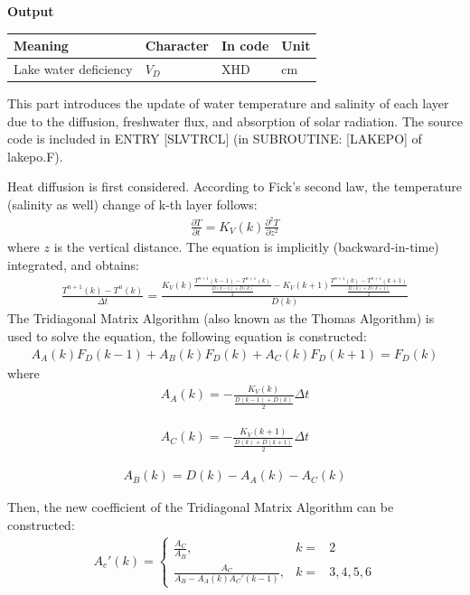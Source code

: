 \textbf{Output}

\begin{longtable}[]{@{}llll@{}}
\toprule
Meaning & Character & In code & Unit \\
\midrule
\endhead
Lake water deficiency & \(V_{D}\) & XHD & cm \\
\bottomrule
\end{longtable}

This part introduces the update of water temperature and salinity of each layer due to the diffusion, freshwater flux, and absorption of solar radiation. The source code is included in ENTRY
{[}SLVTRCL{]} (in SUBROUTINE: {[}LAKEPO{]} of lakepo.F).

Heat diffusion is first considered. According to Fick's second law, the temperature (salinity as well) change of k-th layer follows: \begin{eqnarray}
\frac{\partial T}{\partial t}=K_{V}(k)\frac{\partial^2 T}{\partial z^2}
\end{eqnarray} where \(z\) is the vertical distance. The equation is implicitly (backward-in-time) integrated, and obtains: \begin{eqnarray}
\frac{T^{n+1}(k)-T^{n}(k)}{\Delta t}=\frac{K_{V}(k)\frac{T^{n+1}(k-1)-T^{n+1}(k)}{\frac{D(k-1)+D(k)}{2}}-K_{V}(k+1)\frac{T^{n+1}(k)-T^{n+1}(k+1)}{\frac{D(k)+D(k+1)}{2}}}{D(k)}
\end{eqnarray} The Tridiagonal Matrix Algorithm (also known as the Thomas Algorithm) is used to solve the equation, the following equation is constructed: \begin{eqnarray}
A_{A}(k)F_{D}(k-1)+A_{B}(k)F_{D}(k)+A_{C}(k)F_{D}(k+1)=F_{D}(k)
\end{eqnarray} where \begin{eqnarray}
A_{A}(k)=-\frac{K_{V}(k)}{\frac{D(k-1)+D(k)}{2}}\Delta t
\end{eqnarray}

\begin{eqnarray}
A_{C}(k)=-\frac{K_{V}(k+1)}{\frac{D(k)+D(k+1)}{2}}\Delta t
\end{eqnarray}

\begin{eqnarray}
A_{B}(k)=D(k)-A_{A}(k)-A_{C}(k)
\end{eqnarray}

Then, the new coefficient of the Tridiagonal Matrix Algorithm can be constructed: \begin{eqnarray}
A_{c}'(k)=\left\{\begin{matrix}
\frac{A_{C}}{A_{B}},&k=&2\\\frac{A_{C}}{A_{B}-A_{A}(k)A_{C}'(k-1)}, &k=&3, 4, 5, 6
\end{matrix}\right.
\end{eqnarray}

